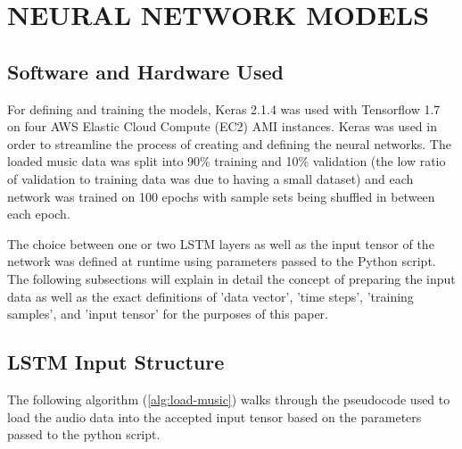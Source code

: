 \section{NEURAL NETWORK MODELS} \label{sec:nn-models}

    \subsection{Software and Hardware Used}
    For defining and training the models, Keras 2.1.4 was used with Tensorflow 1.7 on four AWS Elastic Cloud Compute (EC2) AMI instances. Keras was used in order to streamline the process of creating and defining the neural networks. The loaded music data was split into 90\% training and 10\% validation (the low ratio of validation to training data was due to having a small dataset) and each network was trained on 100 epochs with sample sets being shuffled in between each epoch.
    
    The choice between one or two LSTM layers as well as the input tensor of the network was defined at runtime using parameters passed to the Python script. The following subsections will explain in detail the concept of preparing the input data as well as the exact definitions of 'data vector', 'time steps', 'training samples', and 'input tensor' for the purposes of this paper.
    
    \subsection{LSTM Input Structure}
     The following algorithm (\ref{alg:load-music}) walks through the pseudocode used to load the audio data into the accepted input tensor based on the parameters passed to the python script.
     
